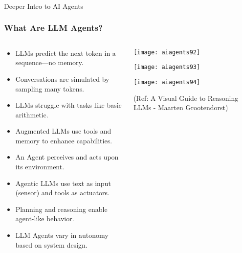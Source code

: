 \begin{frame}[fragile]\frametitle{}
\begin{center}
{\Large Deeper Intro to AI Agents}


\end{center}
\end{frame}


\begin{frame}[fragile]\frametitle{What Are LLM Agents?}
\begin{columns}
    \begin{column}[T]{0.6\linewidth}
      \begin{itemize}
        \item LLMs predict the next token in a sequence—no memory.
        \item Conversations are simulated by sampling many tokens.
        \item LLMs struggle with tasks like basic arithmetic.
        \item Augmented LLMs use tools and memory to enhance capabilities.
        \item An Agent perceives and acts upon its environment.
        \item Agentic LLMs use text as input (sensor) and tools as actuators.
        \item Planning and reasoning enable agent-like behavior.
        \item LLM Agents vary in autonomy based on system design.
      \end{itemize}
    \end{column}
    \begin{column}[T]{0.4\linewidth}
        \begin{center}
        \texttt{[image: aiagents92]}
		
        \texttt{[image: aiagents93]}
		
        \texttt{[image: aiagents94]}
		
        {\tiny (Ref: A Visual Guide to Reasoning LLMs - Maarten Grootendorst)}
        \end{center}
    \end{column}
\end{columns}
\end{frame}


